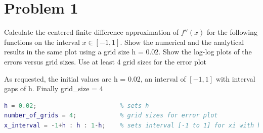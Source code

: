 \documentclass[10pt,letterpaper]{article}
\begin{document}

\section*{Problem 1} %

Calculate the centered finite difference approximation of $f''(x)$ for the following functions on the interval $x \in [-1,1]$. Show the numerical and the analytical results in the same plot using a grid size h = 0.02. Show the log-log plots of the errors versus grid sizes. Use at least 4 grid sizes for the error plot


As requested, the initial values are h = 0.02, an interval of $[-1,1]$ with interval gaps of h. Finally grid\_size = 4

\begin{lstlisting}[language = Matlab]
h = 0.02;                       % sets h
number_of_grids = 4;            % grid sizes for error plot
x_interval = -1+h : h : 1-h;    % sets interval [-1 to 1] for xi with h gap
\end{lstlisting}
\end{document}
